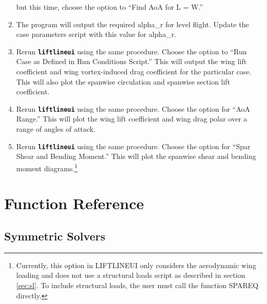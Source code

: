 \documentclass{article}
\begin{document}
\begin{enumerate}
    but this time, choose the option to ``Find AoA for L = W.''
  \item The program will output the required alpha\_r for level
    flight.  Update the case parameters script with this value for
    alpha\_r.
  \item Rerun \texttt{\textbf{liftlineui}} using the same procedure.
    Choose the option to ``Run Case as Defined in Run Conditions
    Script.''  This will output the wing lift coefficient and wing
    vortex-induced drag coefficient for the particular case.  This
    will also plot the spanwise circulation and spanwise section lift
    coefficient.
  \item Rerun \texttt{\textbf{liftlineui}} using the same procedure.
    Choose the option for ``AoA Range.''  This will plot the wing lift
    coefficient and wing drag polar over a range of angles of attack.
  \item Rerun \texttt{\textbf{liftlineui}} using the same procedure.
    Choose the option for ``Spar Shear and Bending Moment.''  This
    will plot the spanwise shear and bending moment
    diagrams.\footnote{Currently, this option in LIFTLINEUI only
      considers the aerodynamic wing loading and does not use a
      structural loads script as described in section \ref{sec:sl}.
      To include structural loads, the user must call the function
      SPAREQ directly.}
\end{enumerate}
\section{Function Reference}
\subsection{Symmetric Solvers}
\end{document}
